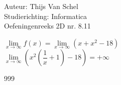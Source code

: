 \documentclass[a4paper]{article}
\begin{document}
  
\noindent \large Auteur: Thijs Van Schel \\
\noindent \large Studierichting: Informatica\\
\noindent \large Oefeningenreeks 2D nr. 8.11\\

\medskip

\normalsize

$\lim\limits_{x\rightarrow \infty} f(x) = \lim\limits_{x\rightarrow \infty}(x+x^2-18)$\\

$\lim\limits_{x\rightarrow \infty} \left(x^2\left(\dfrac{1}{x} +1 \right)-18\right)= +\infty$\\

\begin{thebibliography}{999}
\end{thebibliography}
\end{document}
